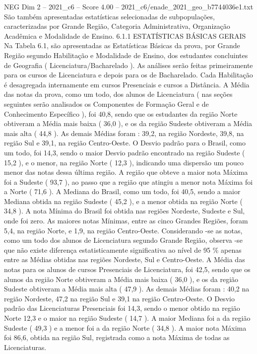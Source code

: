 \begin{textsample}{NEG Dim 2 – 2021\_c6 – Score 4.00 – 2021\_c6/enade\_2021\_geo\_b7744036e1.txt}
São também apresentadas estatísticas selecionadas de subpopulações, caracterizadas por Grande Região, Categoria Administrativa, Organização Acadêmica e Modalidade de Ensino. 6.1.1 ESTATÍSTICAS BÁSICAS GERAIS Na Tabela 6.1, são apresentadas as Estatísticas Básicas da prova, por Grande Região segundo Habilitação e Modalidade de Ensino, dos estudantes concluintes de Geografia ( Licenciatura/Bacharelado ).
As análises serão feitas primeiramente para os cursos de Licenciatura e depois para os de Bacharelado.
Cada Habilitação é desagregada internamente em cursos Presenciais e cursos a Distância.
A Média das notas da prova, como um todo, dos alunos de Licenciatura ( nas seções seguintes serão analisados os Componentes de Formação Geral e de Conhecimento Específico ), foi 40,8, sendo que os estudantes da região Norte obtiveram a Média mais baixa ( 36,0 ), e os da região Sudeste obtiveram a Média mais alta ( 44,8 ).
As demais Médias foram : 39,2, na região Nordeste, 39,8, na região Sul e 39,1, na região Centro-Oeste.
O Desvio padrão para o Brasil, como um todo, foi 14,3, sendo o maior Desvio padrão encontrado na região Sudeste ( 15,2 ), e o menor, na região Norte ( 12,3 ), indicando uma dispersão um pouco menor das notas dessa última região.
A região que obteve a maior nota Máxima foi a Sudeste ( 93,7 ), ao passo que a região que atingiu a menor nota Máxima foi a Norte ( 71,6 ).
A Mediana do Brasil, como um todo, foi 40,5, sendo a maior Mediana obtida na região Sudeste ( 45,2 ), e a menor obtida na região Norte ( 34,8 ).
A nota Mínima do Brasil foi obtida nas regiões Nordeste, Sudeste e Sul, onde foi zero.
As maiores notas Mínimas, entre as cinco Grandes Regiões, foram 5,4, na região Norte, e 1,9, na região Centro-Oeste.
Considerando -se as notas, como um todo dos alunos de Licenciatura segundo Grande Região, observa -se que não existe diferença estatisticamente significativa ao nível de 95 \% apenas entre as Médias obtidas nas regiões Nordeste, Sul e Centro-Oeste.
A Média das notas para os alunos de cursos Presenciais de Licenciatura, foi 42,5, sendo que os alunos da região Norte obtiveram a Média mais baixa ( 36,0 ), e os da região Sudeste obtiveram a Média mais alta ( 47,9 ).
As demais Médias foram : 40,2 na região Nordeste, 47,2 na região Sul e 39,1 na região Centro-Oeste.
O Desvio padrão das Licenciaturas Presenciais foi 14,3, sendo o menor obtido na região Norte 12,3 e o maior na região Sudeste ( 14,7 ).
A maior Mediana foi a da região Sudeste ( 49,3 ) e a menor foi a da região Norte ( 34,8 ).
A maior nota Máxima foi 86,6, obtida na região Sul, registrada como a nota Máxima de todas as Licenciaturas.

\end{textsample}
